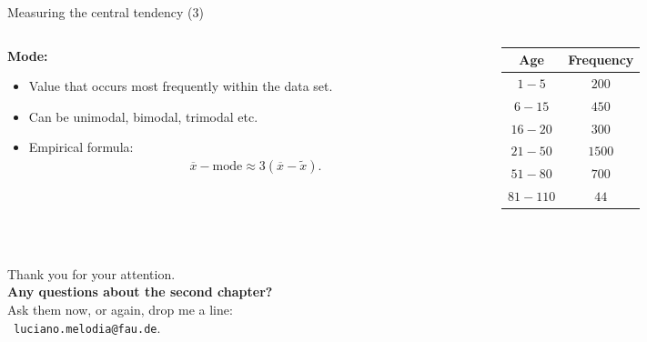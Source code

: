 \documentclass[aspectratio=169,t]{beamer}
\begin{document}
  { 
    \begin{frame}{Measuring the central tendency (3)}
      \begin{columns}
        \begin{column}{0.6\textwidth}
          \textbf{Mode:}
          \begin{itemize}[noitemsep]
            \item Value that occurs most frequently within the data set.
            \item Can be unimodal, bimodal, trimodal etc.
            \item Empirical formula:
            \begin{align}
              \overline{x} - \text{mode} \approx 3(\overline{x}- \tilde{x}).
            \end{align}
          \end{itemize}
        \end{column}
        \begin{column}{0.3\textwidth}  %
        \begin{table}
        \begin{tabular}{|c|c|}
          Age & Frequency \\ \hline
          $1-5$ & $200$ \\
          $6-15$ & $450$ \\
          $16-20$ & $300$ \\
          $21-50$ & $1500$ \\
          $51-80$ & $700$ \\
          $81-110$ & $44$
        \end{tabular}\\[0.5cm]
        \end{table}
        \end{column}
      \end{columns}
    \end{frame}
  }


  { %
    \begin{frame}[c]
      \begin{center}
        Thank you for your attention.\\
        {\bf Any questions about the second chapter?}\\[0.5cm]
        Ask them now, or again, drop me a line: \\ 
        \faSendO \ \texttt{luciano.melodia@fau.de}.
      \end{center}
    \end{frame}
  }
\end{document}
